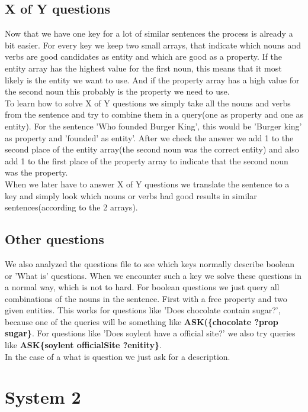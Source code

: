 \documentclass{article}
\begin{document}
\subsection*{X of Y questions}
Now that we have one key for a lot of similar sentences the process is already a bit easier. For every key we keep two small arrays, that indicate which nouns and verbs are good candidates as entity and which are good as a property. If the entity array has the highest value for the first noun, this means that it most likely is the entity we want to use. And if the property array has a high value for the second noun this probably is the property we need to use.\\
To learn how to solve X of Y questions we simply take all the nouns and verbs from the sentence and try to combine them in a query(one as property and one as entity). For the sentence 'Who founded Burger King', this would be 'Burger king' as property and 'founded' as entity'. After we check the answer we add 1 to the second place of the entity array(the second noun was the correct entity) and also add 1 to the first place of the property array to indicate that the second noun was the property.\\
When we later have to answer X of Y questions we translate the sentence to a key and simply look which nouns or verbs had good results in similar sentences(according to the 2 arrays).

\subsection*{Other questions}
We also analyzed the questions file to see which keys normally describe boolean or 'What is' questions. When we encounter such a key we solve these questions in a normal way, which is not to hard. For boolean questions we just query all combinations of the nouns in the sentence. First with a free property and two given entities. This works for questions like 'Does chocolate contain sugar?', because one of the queries will be something like \textbf{ASK(\{chocolate ?prop sugar\}}. For questions like 'Does soylent have a official site?' we also try queries like \textbf{ASK\{soylent officialSite ?enitity\}}.\\
In the case of a what is question we just ask for a description.

\section*{System 2}
\end{document}

